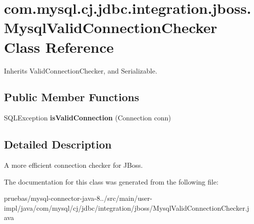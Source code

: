 \hypertarget{classcom_1_1mysql_1_1cj_1_1jdbc_1_1integration_1_1jboss_1_1_mysql_valid_connection_checker}{}\section{com.\+mysql.\+cj.\+jdbc.\+integration.\+jboss.\+Mysql\+Valid\+Connection\+Checker Class Reference}
\label{classcom_1_1mysql_1_1cj_1_1jdbc_1_1integration_1_1jboss_1_1_mysql_valid_connection_checker}


Inherits Valid\+Connection\+Checker, and Serializable.

\subsection*{Public Member Functions}
\begin{DoxyCompactItemize}
\item 
\mbox{\label{classcom_1_1mysql_1_1cj_1_1jdbc_1_1integration_1_1jboss_1_1_mysql_valid_connection_checker_a1128671b67d25ea87ad6f48b371d48a4}} 
S\+Q\+L\+Exception {\bfseries is\+Valid\+Connection} (Connection conn)
\end{DoxyCompactItemize}


\subsection{Detailed Description}
A more efficient connection checker for J\+Boss. 

The documentation for this class was generated from the following file\+:\begin{DoxyCompactItemize}
\item 
pruebas/mysql-\/connector-\/java-\/8../src/main/user-\/impl/java/com/mysql/cj/jdbc/integration/jboss/Mysql\+Valid\+Connection\+Checker.\+java\end{DoxyCompactItemize}
